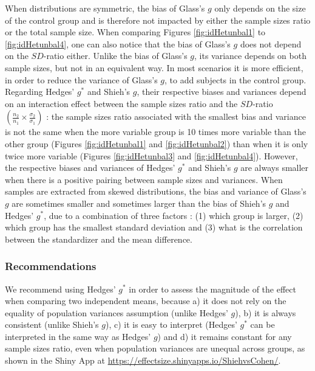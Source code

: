 \documentclass[
  english,
  man]{apa6}
\begin{document}
When distributions are symmetric, the bias of Glass's \(g\) only depends on the size of the control group and is therefore not impacted by either the sample sizes ratio or the total sample size. When comparing Figures \ref{fig:idHetunbal1} to \ref{fig:idHetunbal4}, one can also notice that the bias of Glass's \(g\) does not depend on the \(SD\)-ratio either. Unlike the bias of Glass's \(g\), its variance depends on both sample sizes, but not in an equivalent way. In most scenarios it is more efficient, in order to reduce the variance of Glass's \(g\), to add subjects in the control group. Regarding Hedges' \(g^*\) and Shieh's \(g\), their respective biases and variances depend on an interaction effect between the sample sizes ratio and the \(SD\)-ratio \(\left( \frac{n_2}{n_1} \times \frac{\sigma_2}{\sigma_1} \right)\) : the sample sizes ratio associated with the smallest bias and variance is not the same when the more variable group is 10 times more variable than the other group (Figures \ref{fig:idHetunbal1} and \ref{fig:idHetunbal2}) than when it is only twice more variable (Figures \ref{fig:idHetunbal3} and \ref{fig:idHetunbal4}). However, the respective biases and variances of Hedges' \(g^*\) and Shieh's \(g\) are always smaller when there is a positive pairing between sample sizes and variances. When samples are extracted from skewed distributions, the bias and variance of Glass's \(g\) are sometimes smaller and sometimes larger than the bias of Shieh's \(g\) and Hedges' \(g^*\), due to a combination of three factors : (1) which group is larger, (2) which group has the smallest standard deviation and (3) what is the correlation between the standardizer and the mean difference.

\hypertarget{recommendations}{%
\subsubsection{Recommendations}\label{recommendations}}

We recommend using Hedges' \(g^*\) in order to assess the magnitude of the effect when comparing two independent means, because a) it does not rely on the equality of population variances assumption (unlike Hedges' \(g\)), b) it is always consistent (unlike Shieh's \(g\)), c) it is easy to interpret (Hedges' \(g^*\) can be interpreted in the same way as Hedges' \(g\)) and d) it remains constant for any sample sizes ratio, even when population variances are unequal across groups, as shown in the Shiny App at \url{https://effectsize.shinyapps.io/ShiehvsCohen/}.
\end{document}
